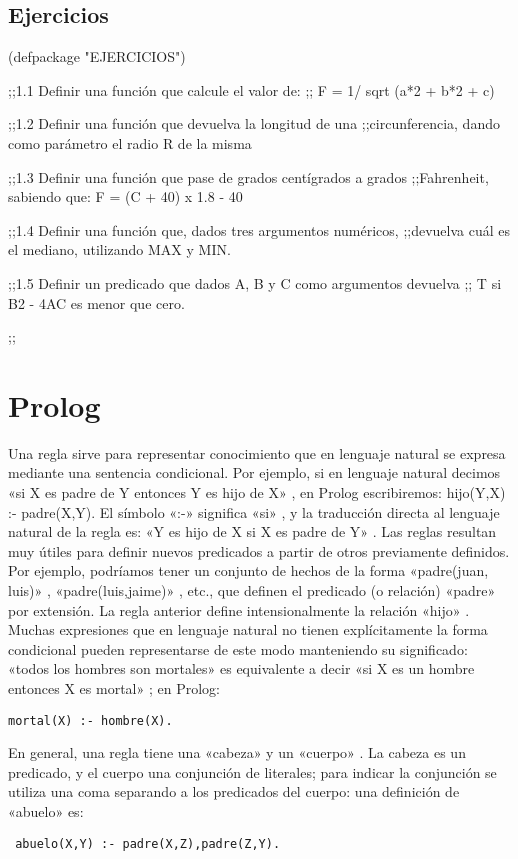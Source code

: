 \documentclass[11pt]{article}
\begin{document}
\subsection*{Ejercicios}
\label{sec:orgae307f1}

(defpackage "EJERCICIOS")

;;1.1 Definir una función que calcule el valor de:
;; F = 1/ sqrt (a*2 + b*2 + c)


;;1.2 Definir una función que devuelva la longitud de una
;;circunferencia, dando como parámetro el radio R de la misma


;;1.3 Definir una función que pase de grados centígrados a grados
;;Fahrenheit, sabiendo que: F = (C + 40) x 1.8 - 40

;;1.4 Definir una función que, dados tres argumentos numéricos,
;;devuelva cuál es el mediano, utilizando MAX y MIN.

;;1.5 Definir un predicado que dados A, B y C como argumentos devuelva
;;    T si B2 - 4AC es menor que cero.

;;


\section*{Prolog}
\label{sec:org07743b7}

Una regla sirve para representar conocimiento que en lenguaje natural
 se expresa mediante una sentencia condicional. Por ejemplo, si en
 lenguaje natural decimos «si X es padre de Y entonces Y es hijo de X»
 , en Prolog escribiremos: hijo(Y,X) :- padre(X,Y).  El símbolo «:-»
 significa «si» , y la traducción directa al lenguaje natural de la
 regla es: «Y es hijo de X si X es padre de Y» .  Las reglas resultan
 muy útiles para definir nuevos predicados a partir de otros
 previamente definidos. Por ejemplo, podríamos tener un conjunto de
 hechos de la forma «padre(juan, luis)» , «padre(luis,jaime)» , etc.,
 que definen el predicado (o relación) «padre» por extensión. La regla
 anterior define intensionalmente la relación «hijo» .  Muchas
 expresiones que en lenguaje natural no tienen explícitamente la forma
 condicional pueden representarse de este modo manteniendo su
 significado: «todos los hombres son mortales» es equivalente a decir
 «si X es un hombre entonces X es mortal» ; en Prolog:

\begin{verbatim}
mortal(X) :- hombre(X).
\end{verbatim}

En general, una regla tiene una «cabeza» y un «cuerpo» . La cabeza es
un predicado, y el cuerpo una conjunción de literales; para indicar la
conjunción se utiliza una coma separando a los predicados del cuerpo:
una definición de «abuelo» es:
\begin{verbatim}
 abuelo(X,Y) :- padre(X,Z),padre(Z,Y).
\end{verbatim}
\end{document}
